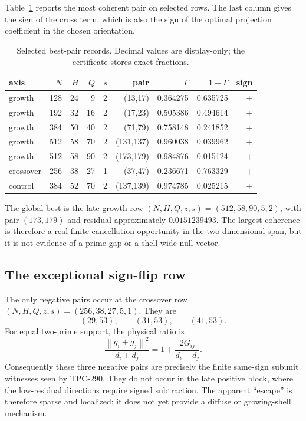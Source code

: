 \documentclass[10pt]{article}
\newcommand{\norm}[1]{\left\lVert #1\right\rVert}
\begin{document}
Table~\ref{tab:rows} reports the most coherent pair on selected rows.  The
last column gives the sign of the cross term, which is also the sign of the
optimal projection coefficient in the chosen orientation.

\begin{table}[ht]
\centering
\scriptsize
\caption{Selected best-pair records.  Decimal values are display-only;
the certificate stores exact fractions.}
\label{tab:rows}
\begin{tabular}{@{}lrrrrrrrr@{}}
\toprule
axis & $N$ & $H$ & $Q$ & $s$ & pair & $\Gamma$ & $1-\Gamma$ & sign \\
\midrule
growth &128&24&9 &2 &(13,17)    &0.364275&0.635725&+\\
growth &192&32&16&2 &(17,23)    &0.505386&0.494614&+\\
growth &384&50&40&2 &(71,79)    &0.758148&0.241852&+\\
growth &512&58&70&2 &(131,137) &0.960038&0.039962&+\\
growth &512&58&90&2 &(173,179) &0.984876&0.015124&+\\
crossover&256&38&27&1&(37,47)   &0.236671&0.763329&+\\
control &384&52&70&2 &(137,139) &0.974785&0.025215&+\\
\bottomrule
\end{tabular}
\end{table}

The global best is the late growth row $(N,H,Q,z,s)=(512,58,90,5,2)$,
with pair $(173,179)$ and residual approximately $0.0151239493$.  The
largest coherence is therefore a real finite cancellation opportunity in the
two-dimensional span, but it is not evidence of a prime gap or a shell-wide
null vector.

\subsection{The exceptional sign-flip row}

The only negative pairs occur at the crossover row
$(N,H,Q,z,s)=(256,38,27,5,1)$.  They are
\[
 (29,53),\qquad(31,53),\qquad(41,53).
\]
For equal two-prime support, the physical ratio is
\[
 \frac{\norm{g_i+g_j}^2}{d_i+d_j}
 =1+\frac{2G_{ij}}{d_i+d_j}.
\]
Consequently these three negative pairs are precisely the finite
same-sign subunit witnesses seen by TPC-290.  They do not occur in the
late positive block, where the low-residual directions require signed
subtraction.  The apparent ``escape'' is therefore sparse and localized;
it does not yet provide a diffuse or growing-shell mechanism.
\end{document}
